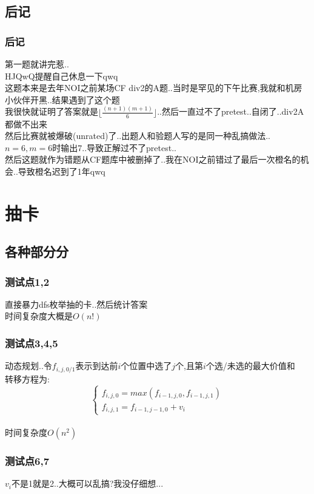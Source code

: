 \documentclass{beamer}
\begin{document}
		\subsection{后记}
			\begin{frame}\frametitle{后记}
				第一题就讲完惹..\\
				HJQwQ提醒自己休息一下qwq\\
				这题本来是去年NOI之前某场CF div2的A题..当时是罕见的下午比赛,我就和机房小伙伴开黑..结果遇到了这个题\\
				我很快就证明了答案就是$\lfloor\frac{(n+1)(m+1)}{6}\rfloor$..然后一直过不了pretest..自闭了..div2A都做不出来\\
				然后比赛就被爆破(unrated)了..出题人和验题人写的是同一种乱搞做法..$n=6,m=6$时输出7..导致正解过不了pretest..\\
				然后这题就作为错题从CF题库中被删掉了..我在NOI之前错过了最后一次橙名的机会..导致橙名迟到了1年qwq
			\end{frame}
	\section{抽卡}
		\subsection{各种部分分}
			\begin{frame}\frametitle{测试点1,2}
				直接暴力dfs枚举抽的卡..然后统计答案\\
				时间复杂度大概是$O(n!)$
			\end{frame}
			\begin{frame}\frametitle{测试点3,4,5}
				动态规划..令$f_{i,j,0/1}$表示到达前$i$个位置中选了$j$个,且第$i$个选/未选的最大价值和\\
				转移方程为:\\
				$$\begin{cases}f_{i,j,0}=max(f_{i-1,j,0},f_{i-1,j,1})\\
				f_{i,j,1}=f_{i-1,j-1,0}+v_i\end{cases}$$\\
				时间复杂度$O(n^2)$
			\end{frame}
			\begin{frame}\frametitle{测试点6,7}
				$v_i$不是1就是2..大概可以乱搞?我没仔细想...
			\end{frame}
\end{document}
